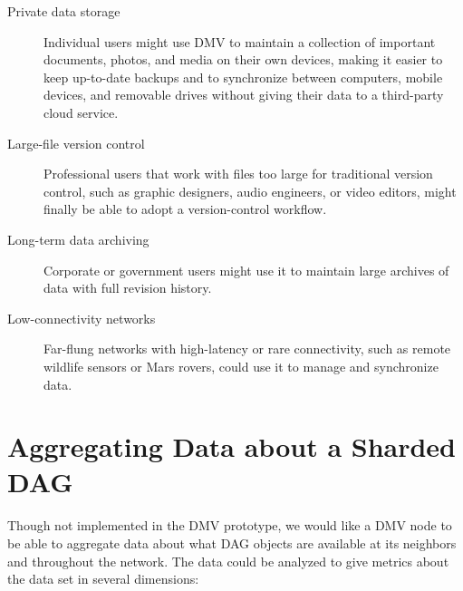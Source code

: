 \begin{description}

    \item[Private data storage] Individual users might use \gls{DMV} to maintain
        a collection of important documents, photos, and media on their own
        devices, making it easier to keep up-to-date backups and to synchronize
        between computers, mobile devices, and removable drives without giving
        their data to a third-party cloud service.

    \item[Large-file version control] Professional users that work with files
        too large for traditional version control, such as graphic designers,
        audio engineers, or video editors, might finally be able to adopt a
        version-control workflow.

    \item[Long-term data archiving] Corporate or government users might use it
        to maintain large archives of data with full revision history.

    \item[Low-connectivity networks] Far-flung networks with high-latency or
        rare connectivity, such as remote wildlife sensors or Mars rovers, could
        use it to manage and synchronize data.

\end{description}

%


\section{Aggregating Data about a Sharded DAG}

Though not implemented in the \gls{DMV} prototype, we would like a \gls{DMV}
node to be able to aggregate data about what DAG objects are available at its
neighbors and throughout the network. The data could be analyzed to give metrics
about the data set in several dimensions:

